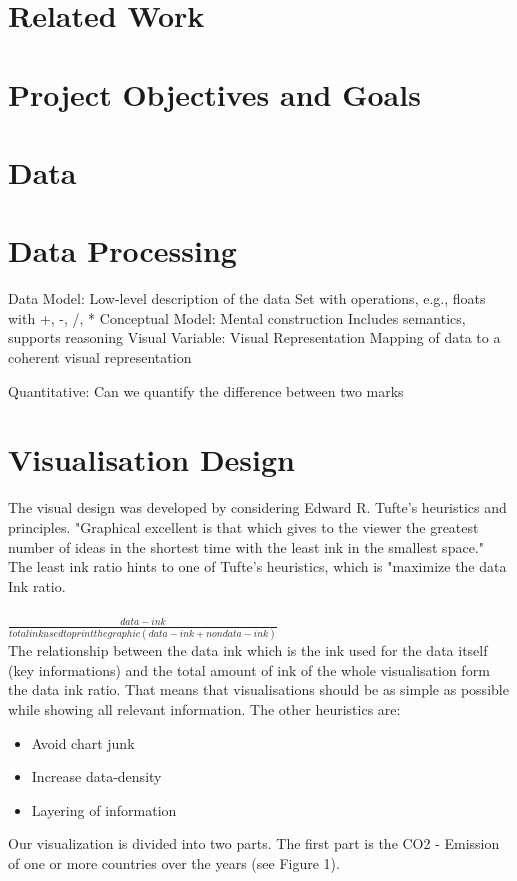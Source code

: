 \documentclass[a4paper]{article}
\begin{document}
\section{Related Work}
\section{Project Objectives and Goals}
\section{Data}
\section{Data Processing}
Data Model: Low-level description of the data 
Set with operations, e.g., floats with +, -, /, * 
Conceptual Model: Mental construction 
Includes semantics, supports reasoning 
Visual Variable: Visual Representation 
Mapping of data to a coherent visual representation


Quantitative: Can we quantify the difference between two marks


\section{Visualisation Design}

The visual design was developed by considering Edward
R. Tufte's heuristics and principles.
"Graphical excellent is that which gives to the
viewer the greatest number of ideas in the shortest time with the least ink in the
smallest space."\cite{Tufte2001} The least ink ratio hints to one of Tufte's heuristics, which is "maximize the data Ink ratio. \\
\\ $\frac{data-ink}{total ink used to print the graphic (data-ink + non data-ink)}$ \\
\newline The relationship between the data ink which is the ink used for the data itself (key informations) and the total amount of ink of the whole visualisation form the data ink ratio.
That means that visualisations should be as simple as possible while showing all relevant information.
The other heuristics are:
\begin{itemize}
    \item Avoid chart junk 
\item Increase data-density 
\item Layering of information
\end{itemize}{}
Our visualization is divided into two parts. The first part is the CO2 - Emission of one or more countries over the years (see Figure 1). 
\end{document}
